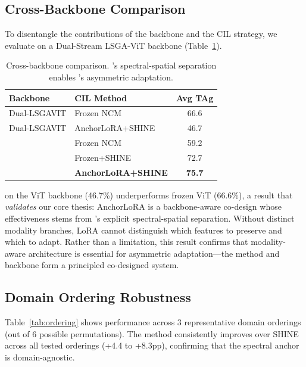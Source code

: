 \subsection{Cross-Backbone Comparison}

To disentangle the contributions of the \backbonename{} backbone and the \methodname{} CIL strategy, we evaluate on a Dual-Stream LSGA-ViT backbone (Table~\ref{tab:crossbb}).

\begin{table}[t]
\centering
\caption{Cross-backbone comparison. \backbonename{}'s spectral-spatial separation enables \methodname{}'s asymmetric adaptation.}
\label{tab:crossbb}
\begin{tabular}{llc}
\toprule
Backbone & CIL Method & Avg TAg \\
\midrule
Dual-LSGAVIT & Frozen NCM & 66.6 \\
Dual-LSGAVIT & AnchorLoRA+SHINE & 46.7 \\
\midrule
\backbonename{} & Frozen NCM & 59.2 \\
\backbonename{} & Frozen+SHINE & 72.7 \\
\backbonename{} & \textbf{AnchorLoRA+SHINE} & \textbf{75.7} \\
\bottomrule
\end{tabular}
\end{table}

\methodname{} on the ViT backbone (46.7\%) underperforms frozen ViT (66.6\%), a result that \emph{validates} our core thesis: AnchorLoRA is a backbone-aware co-design whose effectiveness stems from \backbonename{}'s explicit spectral-spatial separation. Without distinct modality branches, LoRA cannot distinguish which features to preserve and which to adapt. Rather than a limitation, this result confirms that modality-aware architecture is essential for asymmetric adaptation---the method and backbone form a principled co-designed system.

\subsection{Domain Ordering Robustness}

Table~\ref{tab:ordering} shows \methodname{} performance across 3 representative domain orderings (out of 6 possible permutations). The method consistently improves over SHINE across all tested orderings (+4.4 to +8.3pp), confirming that the spectral anchor is domain-agnostic.

